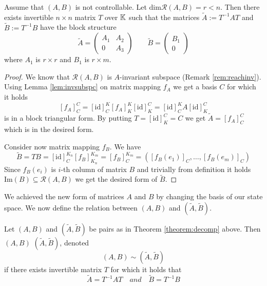 \begin{theorem}
	\label{theorem:decomp}
	Assume that $(A,B)$ is not controllable. Let $\text{dim}\mathcal{R}(A,B)=r<n$. Then there exists invertible $n\times n$ matrix $T$ over $\mathbb{K}$ such that the matrices $\widetilde{A}:=T^{-1}AT$ and $\widetilde{B}:=T^{-1}B$ have the block structure 
	\begin{equation*}
		\widetilde{A}=
		\begin{pmatrix}
			A_1 & A_2 \\
			0   & A_3 
		\end{pmatrix}
		\qquad
		\widetilde{B}=
		\begin{pmatrix}
			B_1  \\
			0
		\end{pmatrix}
	\end{equation*}
	where $A_1$ is $r \times r$ and $B_1$ is $r \times m$.
\end{theorem}

\begin{proof}
	We know that $\mathcal{R}(A,B)$ is $A$-invariant subspace (Remark \ref{rem:reachinv}). Using Lemma \ref{lem:invsubspc} on matrix mapping $f_A$ we get a basis $C$ for which it holds $$[f_A]^C_C=[\text{id}]^K_C[f_A]^K_K[\text{id}]^C_K=[\text{id}]^K_CA[\text{id}]^C_K$$ is in a block triangular form. By putting $T=[\text{id}]^C_K=C$ we get $\widetilde{A}=[f_A]^C_C$ which is in the desired form.

	Consider now matrix mapping $f_B$. We have $$\widetilde{B}=TB=[\text{id}]^{K_n}_C[f_B]^{K_m}_{K_n}=[f_B]^{K_m}_C=([f_B(e_1)]_C,\ldots,[f_B(e_m)]_C)$$ Since $f_B(e_i)$ is $i$-th column of matrix $B$ and trivially from definition it holds $\text{Im}(B)\subseteq \mathcal{R}(A,B)$ we get the desired form of $\widetilde{B}$.
\end{proof}

We achieved the new form of matrices $A$ and $B$ by changing the basis of our state space. We now define the relation between $(A,B)$ and $(\widetilde{A},\widetilde{B}).$

\begin{definition}
	Let $(A,B)$ and $(\widetilde{A},\widetilde{B})$ be pairs as in Theorem \ref{theorem:decomp} above. Then $(A,B)$  $(\widetilde{A},\widetilde{B})$, denoted $$(A,B) \sim (\widetilde{A},\widetilde{B})$$ if there exists invertible matrix $T$ for which it holds that $$\widetilde{A}=T^{-1}AT\quad and\quad\widetilde{B}=T^{-1}B$$
\end{definition}

